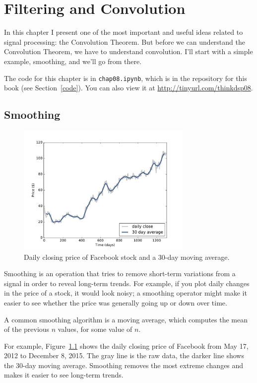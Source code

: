 \documentclass[12pt]{book}
\begin{document}
\chapter{Filtering and Convolution}

In this chapter I present one of the most important and useful
ideas related to signal processing: the Convolution Theorem.
But before we can understand the Convolution Theorem, we have to understand
convolution.  I'll start with a simple example, smoothing, and
we'll go from there.

The code for this chapter is in {\tt chap08.ipynb}, which is in the
repository for this book (see Section~\ref{code}).
You can also view it at \url{http://tinyurl.com/thinkdsp08}.


\section{Smoothing}
\label{smoothing}

\begin{figure}
\centerline{\includegraphics[height=2.5in]{figs/convolution1.pdf}}
\caption{Daily closing price of Facebook stock and a 30-day moving
average.}
\label{fig.convolution1}
\end{figure}

Smoothing is an operation that tries to remove short-term variations
from a signal in order to reveal long-term trends.  For example, if
you plot daily changes in the price of a stock, it would look noisy;
a smoothing operator might make it easier to see whether the price
was generally going up or down over time.

A common smoothing algorithm is a moving average, which computes
the mean of the previous $n$ values, for some value of $n$.

For example, Figure~\ref{fig.convolution1} shows the daily
closing price of Facebook from May 17, 2012 to December 8,
2015.  The gray line
is the raw data, the darker line shows the 30-day moving average.
Smoothing removes the most
extreme changes and makes it easier to see long-term trends.
\end{document}

